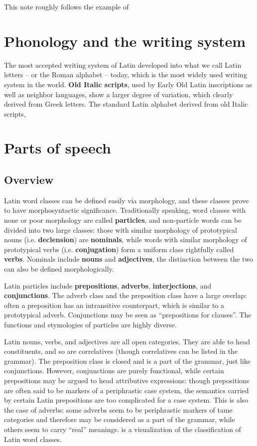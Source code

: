 \documentclass[a4paper, oneside]{report}
\newcommand*{\concept}[1]{\textbf{#1}}
\begin{document}
This note roughly follows the example of 

\chapter{Phonology and the writing system}

The most accepted writing system of Latin developed into 
what we call Latin letters -- or the Roman alphabet -- today, 
which is the most widely used writing system in the world.
\concept{Old Italic scripts},
used by Early Old Latin inscriptions 
as well as neighbor languages,
show a larger degree of variation, 
which clearly derived from Greek letters.
The standard Latin alphabet derived from old Italic scripts, 


\chapter{Parts of speech}

\section{Overview}

Latin word classes can be defined easily via morphology,
and these classes prove to have morphosyntactic significance.
Traditionally speaking, 
word classes with none or poor morphology are called \concept{particles},
and non-particle words can be divided into two large classes:
those with similar morphology of prototypical nouns (i.e. \concept{declension}) are \concept{nominals},
while words with similar morphology of prototypical verbs (i.e. \concept{conjugation})
form a uniform class rightfully called \concept{verbs}.
Nominals include \concept{nouns} and \concept{adjectives},
the distinction between the two can also be defined morphologically.

Latin particles include \concept{prepositions}, \concept{adverbs},
\concept{interjections}, and \concept{conjunctions}.
The adverb class and the preposition class have a large overlap:
often a preposition has an intransitive counterpart,
which is similar to a prototypical adverb.
Conjunctions may be seen as ``prepositions for clauses''.
The functions and etymologies of particles are highly diverse.

Latin nouns, verbs, and adjectives are all open categories.
They are able to head constituents,
and so are correlatives (though correlatives can be listed in the grammar).
The preposition class is closed and is a part of the grammar,
just like conjunctions.
However, conjunctions are purely functional,
while certain prepositions may be argued to head attributive expressions:
though prepositions are often said to be markers of a periphrastic case system,
the semantics carried by certain Latin prepositions are too complicated for a case system.
This is also the case of adverbs:
some adverbs seem to be periphrastic markers of \acs{tame} categories
and therefore may be considered as a part of the grammar,
while others seem to carry ``real'' meanings.
 is a visualization of the classification of Latin word classes.
\end{document}
